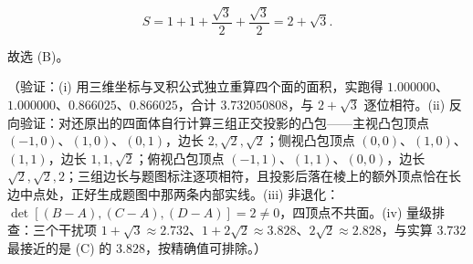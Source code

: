 \begin{answer}
\nopagebreak[4]
\[
S=1+1+\dfrac{\sqrt{3}}{2}+\dfrac{\sqrt{3}}{2}=2+\sqrt{3}.
\]

故选 (B)。

（验证：(i) 用三维坐标与叉积公式独立重算四个面的面积，实跑得 \(1.000000\)、\(1.000000\)、\(0.866025\)、\(0.866025\)，合计 \(3.732050808\)，与 \(2+\sqrt{3}\) 逐位相符。(ii) 反向验证：对还原出的四面体自行计算三组正交投影的凸包——主视凸包顶点 \((-1,0)\)、\((1,0)\)、\((0,1)\)，边长 \(2,\sqrt{2},\sqrt{2}\)；侧视凸包顶点 \((0,0)\)、\((1,0)\)、\((1,1)\)，边长 \(1,1,\sqrt{2}\)；俯视凸包顶点 \((-1,1)\)、\((1,1)\)、\((0,0)\)，边长 \(\sqrt{2},\sqrt{2},2\)；三组边长与题图标注逐项相符，且投影后落在棱上的额外顶点恰在长边中点处，正好生成题图中那两条内部实线。(iii) 非退化：\(\det[(B-A),(C-A),(D-A)]=2\neq 0\)，四顶点不共面。(iv) 量级排查：三个干扰项 \(1+\sqrt{3}\approx 2.732\)、\(1+2\sqrt{2}\approx 3.828\)、\(2\sqrt{2}\approx 2.828\)，与实算 \(3.732\) 最接近的是 (C) 的 \(3.828\)，按精确值可排除。）


\end{answer}
